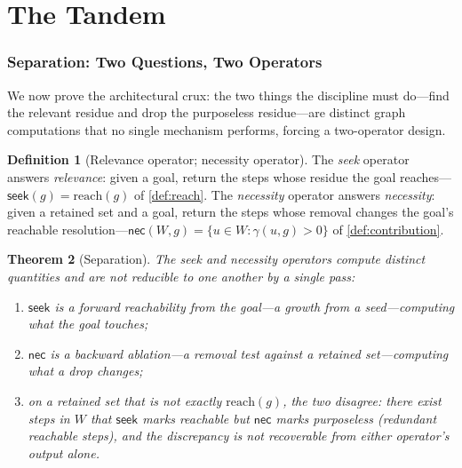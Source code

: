 \documentclass[11pt,a4paper]{article}
\theoremstyle{thmstyle}
\newtheorem{theorem}{Theorem}[section]
\theoremstyle{definition}
\newtheorem{definition}[theorem]{Definition}
\theoremstyle{remark}
\newcommand{\goal}{g}                   %
\newcommand{\reach}{\mathrm{reach}}
\newcommand{\contrib}{\gamma}           %
\newcommand{\seek}{\textsf{seek}}
\newcommand{\nec}{\textsf{nec}}
\newcommand{\set}[1]{\{#1\}}
\begin{document}
\part{The Tandem}

\section{Separation: Two Questions, Two Operators}
\label{sec:separation}

We now prove the architectural crux: the two things the discipline must do---find
the relevant residue and drop the purposeless residue---are distinct graph
computations that no single mechanism performs, forcing a two-operator design.

\begin{definition}[Relevance operator; necessity operator]
\label{def:operators}
The \emph{seek} operator answers \emph{relevance}: given a goal, return the steps
whose residue the goal reaches---$\seek(\goal)=\reach(\goal)$ of \cref{def:reach}.
The \emph{necessity} operator answers \emph{necessity}: given a retained set and a
goal, return the steps whose removal changes the goal's reachable
resolution---$\nec(W,\goal)=\set{u\in W:\contrib(u,\goal)>0}$ of
\cref{def:contribution}.
\end{definition}

\begin{theorem}[Separation]
\label{thm:separation}
The seek and necessity operators compute distinct quantities and are not
reducible to one another by a single pass:
\begin{enumerate}[label=\textup{(\roman*)},leftmargin=2.2em,itemsep=2pt]
\item $\seek$ is a \emph{forward} reachability from the goal---a growth from a
seed---computing what the goal \emph{touches};
\item $\nec$ is a \emph{backward} ablation---a removal test against a retained
set---computing what a drop \emph{changes};
\item on a retained set that is not exactly $\reach(\goal)$, the two disagree:
there exist steps in $W$ that $\seek$ marks reachable but $\nec$ marks
purposeless (redundant reachable steps), and the discrepancy is not recoverable
from either operator's output alone.
\end{enumerate}
\end{theorem}
\end{document}
